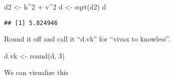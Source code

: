 \documentclass[
]{book}
\newenvironment{Shaded}{\begin{snugshade}}{\end{snugshade}}
\newcommand{\DecValTok}[1]{\textcolor[rgb]{0.00,0.00,0.81}{#1}}
\newcommand{\FunctionTok}[1]{\textcolor[rgb]{0.00,0.00,0.00}{#1}}
\newcommand{\NormalTok}[1]{#1}
\newcommand{\OtherTok}[1]{\textcolor[rgb]{0.56,0.35,0.01}{#1}}
\newcommand{\SpecialCharTok}[1]{\textcolor[rgb]{0.00,0.00,0.00}{#1}}
\begin{document}
\begin{Shaded}
\begin{Highlighting}[]
\NormalTok{d2 }\OtherTok{\textless{}{-}}\NormalTok{ h}\SpecialCharTok{\^{}}\DecValTok{2} \SpecialCharTok{+}\NormalTok{ v}\SpecialCharTok{\^{}}\DecValTok{2}
\NormalTok{d }\OtherTok{\textless{}{-}} \FunctionTok{sqrt}\NormalTok{(d2)}
\NormalTok{d}
\end{Highlighting}
\end{Shaded}

\begin{verbatim}
## [1] 5.824946
\end{verbatim}

Round it off and call it ``d.vk'' for ``vivax to knowlesi''.

\begin{Shaded}
\begin{Highlighting}[]
\NormalTok{d.vk }\OtherTok{\textless{}{-}} \FunctionTok{round}\NormalTok{(d, }\DecValTok{3}\NormalTok{)}
\end{Highlighting}
\end{Shaded}

We can visualize this
\end{document}
